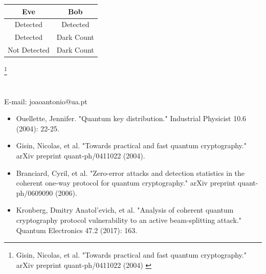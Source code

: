 \documentclass[1000pt]{article}
\newcommand{\mysection}[1]{\section*{\color{black}\sffamily #1}}%
\newcommand{\cref}[1]{{\fontsize{17pt}{0cm}\selectfont\color{black} #1}}%
\newcommand\blfootnote[1]{%
  \begingroup
  \renewcommand\thefootnote{}\footnote{#1}%
  \addtocounter{footnote}{-1}%
  \endgroup
}
\begin{document}
\begin{table}[hbt]
\centering
\begin{tabular}{|c|c|}
\hline
Eve          & Bob        \\ \hline
Detected     & Detected   \\ \hline
Detected     & Dark Count \\ \hline
Not Detected & Dark Count \\ \hline
\end{tabular}
\end{table}

    
\blfootnote{
\hspace*{12cm}
\begin{minipage}{26cm}
\cref{
Gisin, Nicolas, et al. "Towards practical and fast quantum cryptography." arXiv preprint quant-ph/0411022 (2004)
}
\end{minipage}
}
\fi
\mysection{} \sffamily \Large
\vspace{-10mm}
\centerline{E-mail: joaoantonio@ua.pt}
\vspace*{7cm}
\begin{itemize}
	\item Ouellette, Jennifer. "Quantum key distribution." Industrial Physicist 10.6 (2004): 22-25.
	\item Gisin, Nicolas, et al. "Towards practical and fast quantum cryptography." arXiv preprint quant-ph/0411022 (2004).
	\item Branciard, Cyril, et al. "Zero-error attacks and detection statistics in the coherent one-way protocol for quantum cryptography." arXiv preprint quant-ph/0609090 (2006).
	\item Kronberg, Dmitry Anatol'evich, et al. "Analysis of coherent quantum cryptography protocol vulnerability to an active beam-splitting attack." Quantum Electronics 47.2 (2017): 163.
\end{itemize}
\end{document}
